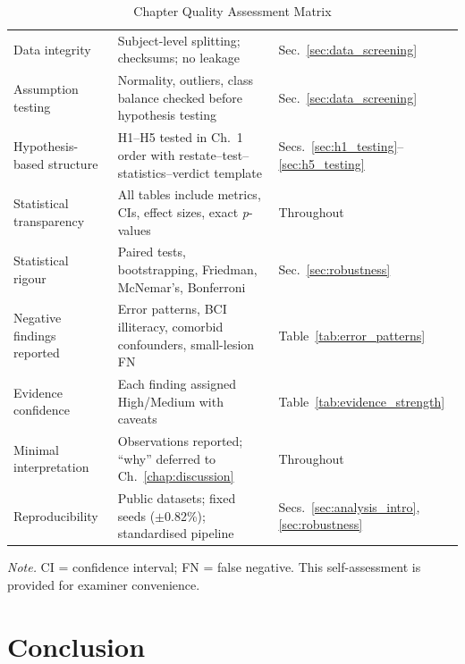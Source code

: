 \begin{table}[H]
\tablestripes
\begin{tabularx}{\textwidth}{L L L}
\toprule
{} &  &  \\
\midrule
Data integrity & Subject-level splitting; checksums; no leakage & Sec.~\ref{sec:data_screening} \\
\addlinespace
Assumption testing & Normality, outliers, class balance checked before hypothesis testing & Sec.~\ref{sec:data_screening} \\
\addlinespace
Hypothesis-based structure & H1--H5 tested in Ch.~1 order with restate--test--statistics--verdict template & Secs.~\ref{sec:h1_testing}--\ref{sec:h5_testing} \\
\addlinespace
Statistical transparency & All tables include metrics, CIs, effect sizes, exact \textit{p}-values & Throughout \\
\addlinespace
Statistical rigour & Paired tests, bootstrapping, Friedman, McNemar's, Bonferroni & Sec.~\ref{sec:robustness} \\
\addlinespace
Negative findings reported & Error patterns, BCI illiteracy, comorbid confounders, small-lesion FN & Table~\ref{tab:error_patterns} \\
\addlinespace
Evidence confidence & Each finding assigned High/Medium with caveats & Table~\ref{tab:evidence_strength} \\
\addlinespace
Minimal interpretation & Observations reported; ``why'' deferred to Ch.~\ref{chap:discussion} & Throughout \\
\addlinespace
Reproducibility & Public datasets; fixed seeds ($\pm$0.82\%); standardised pipeline & Secs.~\ref{sec:analysis_intro}, \ref{sec:robustness} \\
\bottomrule
\end{tabularx}
\caption{Chapter Quality Assessment Matrix}
\label{tab:ch5_quality}
\vspace{0.5em}\noindent\textit{Note.} CI = confidence interval; FN = false negative. This self-assessment is provided for examiner convenience.
\end{table}


\section{Conclusion}
\label{sec:ch5_conclusion}

